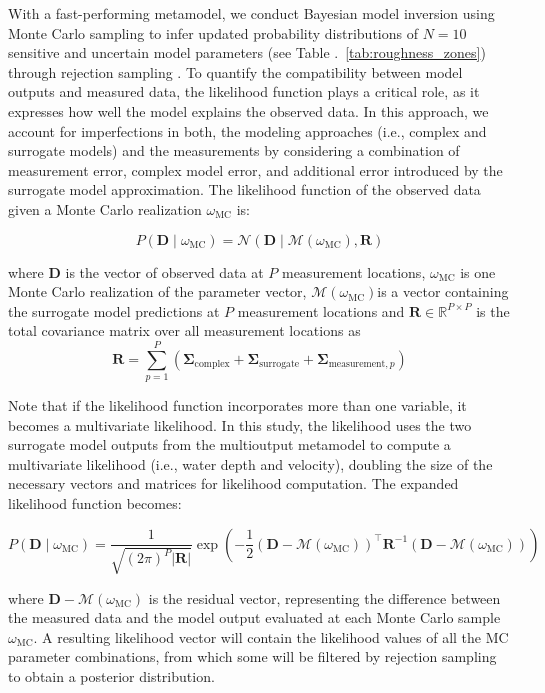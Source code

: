 \documentclass[draft,linenumbers,onecolumn]{agujournal2019} %
\begin{document}
With a fast-performing metamodel, we conduct Bayesian model inversion using Monte Carlo sampling to infer updated probability distributions of \(N = 10\) sensitive and uncertain model parameters (see Table .~\ref{tab:roughness_zones}) through rejection sampling \cite{beckers2020bayesian}. To quantify the compatibility between model outputs and measured data, the likelihood function plays a critical role, as it expresses how well the model explains the observed data. In this approach, we account for imperfections in both, the modeling approaches (i.e., complex and surrogate models) and the measurements by considering a combination of measurement error, complex model error, and additional error introduced by the surrogate model approximation. The likelihood function of the observed data given a Monte Carlo realization \( \omega_{\text{MC}} \) is:

\[
P(\bm{D} \mid \omega_{\text{MC}}) = \mathcal{N}(\bm{D} \mid \mathcal{M}(\omega_{\text{MC}}), \bm{R})
\]

where \( \bm{D} \) is the vector of observed data at \(P\) measurement locations, \( \omega_{\text{MC}} \) is one Monte Carlo realization of the parameter vector, \( \mathcal{M}(\omega_{\text{MC}}) \)is a vector containing the surrogate model predictions at \(P\) measurement locations and \( \bm{R} \in \mathbb{R}^{P \times P} \) is the total covariance matrix over all measurement locations as 
\[
\mathbf{R} = \sum_{p=1}^{P} \left( \mathbf{\Sigma}_{\text{complex}} + \mathbf{\Sigma}_{\text{surrogate}} + \mathbf{\Sigma}_{\text{measurement},p} \right)
\]

Note that if the likelihood function incorporates more than one variable, it becomes a multivariate likelihood. In this study, the likelihood uses the two surrogate model outputs from the multioutput metamodel to compute a multivariate likelihood (i.e., water depth and velocity), doubling the size of the necessary vectors and matrices for likelihood computation. The expanded likelihood function becomes: 

\[
P(\bm{D} \mid \omega_{\text{MC}}) = \frac{1}{\sqrt{(2\pi)^P |\bm{R}|}} \exp\left( -\frac{1}{2} \left( \bm{D} - \mathcal{M}(\omega_{\text{MC}}) \right)^\top \bm{R}^{-1} \left( \bm{D} - \mathcal{M}(\omega_{\text{MC}}) \right) \right)
\]


where \( \bm{D} - \mathcal{M}(\omega_{\text{MC}}) \) is the residual vector, representing the difference between the measured data and the model output evaluated at each Monte Carlo sample \( \omega_{\text{MC}} \). A resulting likelihood vector will contain the likelihood values of all the MC parameter combinations, from which some will be filtered by rejection sampling to obtain a posterior distribution.
\end{document}
